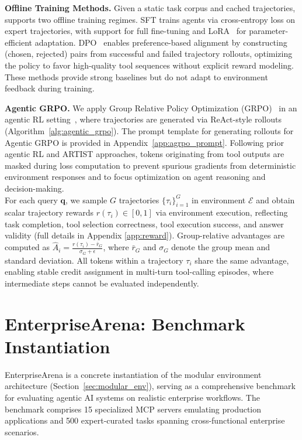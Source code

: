 \documentclass{article}
\theoremstyle{plain}
\theoremstyle{definition}
\theoremstyle{remark}
\begin{document}
\textbf{Offline Training Methods.}
\label{sec:offline-methods}
Given a static task corpus and cached trajectories, \name{} supports two offline training regimes. SFT trains agents via cross-entropy loss on expert trajectories, with support for full fine-tuning and LoRA~\cite{hu2022lora} for parameter-efficient adaptation. DPO~\cite{rafailov2023direct} enables preference-based alignment by constructing (chosen, rejected) pairs from successful and failed trajectory rollouts, optimizing the policy to favor high-quality tool sequences without explicit reward modeling. These methods provide strong baselines but do not adapt to environment feedback during training.


\textbf{Agentic GRPO.}
\label{sec:agentic-grpo}
We apply Group Relative Policy Optimization (GRPO)~\cite{shao2024deepseekmath} in an agentic RL setting~\cite{singh2025agentic}, where trajectories are generated via ReAct-style rollouts (Algorithm~\ref{alg:agentic_grpo}). The prompt template for generating rollouts for Agentic GRPO is provided in Appendix~\ref{app:agrpo_prompt}. Following prior agentic RL and ARTIST approaches, tokens originating from tool outputs are masked during loss computation to prevent spurious gradients from deterministic environment responses and to focus optimization on agent reasoning and decision-making.
\\
\noindent For each query $\mathbf{q}$, we sample $G$ trajectories $\{\tau_i\}_{i=1}^G$ in environment $\mathcal{E}$ and obtain scalar trajectory rewards $r(\tau_i) \in [0,1]$ via environment execution, reflecting task completion, tool selection correctness, tool execution success, and answer validity (full details in Appendix \ref{app:reward}). Group-relative advantages are computed as $\hat{A}_i = \frac{r(\tau_i) - \bar{r}_G}{\sigma_G + \epsilon}$, where $\bar{r}_G$ and $\sigma_G$ denote the group mean and standard deviation. All tokens within a trajectory $\tau_i$ share the same advantage, enabling stable credit assignment in multi-turn tool-calling episodes, where intermediate steps cannot be evaluated independently.


\vspace{-0.2cm}

\section{EnterpriseArena: Benchmark Instantiation}
\label{sec:entarena}
\vspace{-0.2cm}
EnterpriseArena is a concrete instantiation of the modular environment architecture (Section~\ref{sec:modular_env}), serving as a comprehensive benchmark for evaluating agentic AI systems on realistic enterprise workflows. The benchmark comprises 15 specialized MCP servers emulating production applications and 500 expert-curated tasks spanning cross-functional enterprise scenarios.
\end{document}
